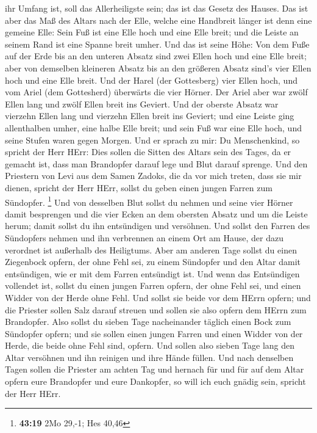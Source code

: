 ihr Umfang ist, soll das Allerheiligste sein; das ist das Gesetz des
Hauses.  Das ist aber das Maß des Altars nach der Elle,
welche eine Handbreit länger ist denn eine gemeine Elle: Sein Fuß ist
eine Elle hoch und eine Elle breit; und die Leiste an seinem Rand ist
eine Spanne breit umher.  Und das ist seine Höhe: Von dem
Fuße auf der Erde bis an den unteren Absatz sind zwei Ellen hoch und
eine Elle breit; aber von demselben kleineren Absatz bis an den größeren
Absatz sind's vier Ellen hoch und eine Elle breit.  Und
der Harel (der Gottesberg) vier Ellen hoch, und vom Ariel (dem
Gottesherd) überwärts die vier Hörner.  Der Ariel aber
war zwölf Ellen lang und zwölf Ellen breit ins Geviert. 
Und der oberste Absatz war vierzehn Ellen lang und vierzehn Ellen breit
ins Geviert; und eine Leiste ging allenthalben umher, eine halbe Elle
breit; und sein Fuß war eine Elle hoch, und seine Stufen waren gegen
Morgen.  Und er sprach zu mir: Du Menschenkind, so
spricht der Herr HErr: Dies sollen die Sitten des Altars sein des Tages,
da er gemacht ist, dass man Brandopfer darauf lege und Blut darauf
sprenge.  Und den Priestern von Levi aus dem Samen
Zadoks, die da vor mich treten, dass sie mir dienen, spricht der Herr
HErr, sollst du geben einen jungen Farren zum Sündopfer. \footnote{\textbf{43:19}
  2Mo 29,-1; Hes 40,46}  Und von desselben Blut sollst du
nehmen und seine vier Hörner damit besprengen und die vier Ecken an dem
obersten Absatz und um die Leiste herum; damit sollst du ihn entsündigen
und versöhnen.  Und sollst den Farren des Sündopfers
nehmen und ihn verbrennen an einem Ort am Hause, der dazu verordnet ist
außerhalb des Heiligtums.  Aber am anderen Tage sollst du
einen Ziegenbock opfern, der ohne Fehl sei, zu einem Sündopfer und den
Altar damit entsündigen, wie er mit dem Farren entsündigt ist.
 Und wenn das Entsündigen vollendet ist, sollst du einen
jungen Farren opfern, der ohne Fehl sei, und einen Widder von der Herde
ohne Fehl.  Und sollst sie beide vor dem HErrn opfern;
und die Priester sollen Salz darauf streuen und sollen sie also opfern
dem HErrn zum Brandopfer.  Also sollst du sieben Tage
nacheinander täglich einen Bock zum Sündopfer opfern; und sie sollen
einen jungen Farren und einen Widder von der Herde, die beide ohne Fehl
sind, opfern.  Und sollen also sieben Tage lang den Altar
versöhnen und ihn reinigen und ihre Hände füllen.  Und
nach denselben Tagen sollen die Priester am achten Tag und hernach für
und für auf dem Altar opfern eure Brandopfer und eure Dankopfer, so will
ich euch gnädig sein, spricht der Herr HErr.

